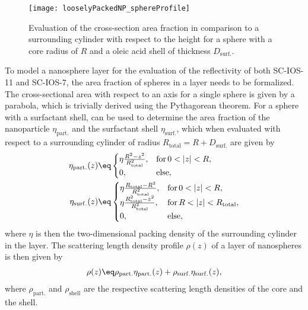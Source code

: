\documentclass[\main/dresen_thesis.tex]{subfiles}
\begin{document}
    \begin{figure}[!htbp]
      \centering
      \texttt{[image: looselyPackedNP\_sphereProfile]}
      \caption{\label{fig:looselyPackedNP:layerCharacterization:sphereProfile}Evaluation of the cross-section area fraction in comparison to a surrounding cylinder with respect to the height for a sphere with a core radius of $R$ and a oleic acid shell of thickness $D_\mathrm{surf.}$.}
    \end{figure}
    To model a nanosphere layer for the evaluation of the reflectivity of both SC-IOS-11 and SC-IOS-7, the area fraction of spheres in a layer needs to be formalized.
    The cross-sectional area with respect to an axis for a single sphere is given by a parabola, which is trivially derived using the Pythagorean theorem.
    For a sphere with a surfactant shell,  can be used to determine the area fraction of the nanoparticle $\eta_\mathrm{part.}$ and the surfactant shell $\eta_\mathrm{surf.}$, which when evaluated with respect to a surrounding cylinder of radius $R_\mathrm{total} = R + D_\mathrm{surf.}$ are given by
    \begin{align}
      \eta_\mathrm{part.} (z)
        &\eq \begin{cases}
        \eta \frac{R^{2} - z^2}{R_\mathrm{total}^2}, &\mathrm{for\,}0<|z|<R, \\
        0,                                            &\mathrm{else},
        \end{cases}\\
      \eta_\mathrm{surf.} (z)
        &\eq \begin{cases}
          \eta \frac{R_\mathrm{total} - R^2}{R_\mathrm{total}^2}, &\mathrm{for\,}0<|z|<R, \\
          \eta \frac{R_\mathrm{total}^2 - z^2}{R_\mathrm{total}^2}, &\mathrm{for\,}R<|z|<R_\mathrm{total},\\
          0,                                            &\mathrm{else},
        \end{cases}
    \end{align}
    where $\eta$ is then the two-dimensional packing density of the surrounding cylinder in the layer.
    The scattering length density profile $\rho(z)$ of a layer of nanospheres is then given by
    \begin{align}
      \label{eq:looselyPackedNP:layerCharacterization:sldFromAreaFraction}
      \rho(z) \eq \rho_\mathrm{part.} \eta_\mathrm{part.}(z) + \rho_\mathrm{surf.} \eta_\mathrm{surf.}(z),
    \end{align}
    where $\rho_\mathrm{part.}$ and $\rho_\mathrm{shell}$ are the respective scattering length densities of the core and the shell.
\end{document}
